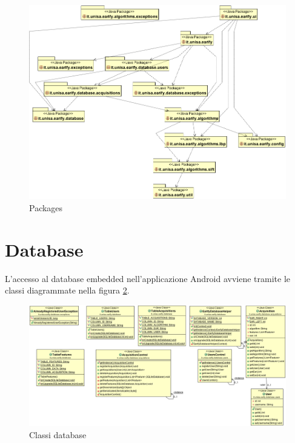 \begin{figure}[ht]
	\centering
	\includegraphics[width=1.5\textwidth, angle=90]{img/pkg.png}
	\caption{Packages}\label{fig:pkg}
\end{figure}

\section{Database}
L'accesso al database embedded nell'applicazione Android avviene tramite le classi diagrammate nella figura \ref{fig:db}.

\begin{figure}[ht]
	\centering
	\includegraphics[width=1.5\textwidth, angle=90]{img/db.png}
	\caption{Classi database}\label{fig:db}
\end{figure}

